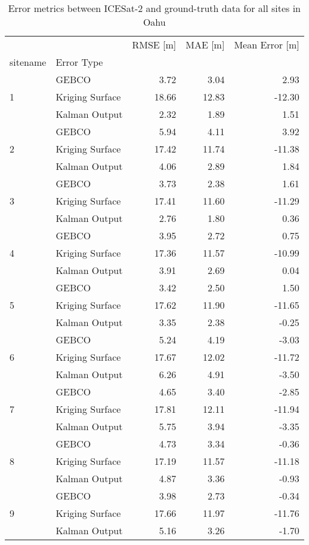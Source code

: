 \begin{table}[htbp]
\centering
\caption{Error metrics between ICESat-2 and ground-truth data for all sites in Oahu}
\label{tab:appendix_oahu_raster_error}
\begin{tabular}{llrrr}
\toprule
 &  & RMSE [m] & MAE [m] & Mean Error [m] \\
sitename & Error Type &  &  &  \\
\midrule
\multirow[c]{3}{*}{1} & GEBCO & 3.72 & 3.04 & 2.93 \\
 & Kriging Surface & 18.66 & 12.83 & -12.30 \\
 & Kalman Output & 2.32 & 1.89 & 1.51 \\
\cline{1-2}
\multirow[c]{3}{*}{2} & GEBCO & 5.94 & 4.11 & 3.92 \\
 & Kriging Surface & 17.42 & 11.74 & -11.38 \\
 & Kalman Output & 4.06 & 2.89 & 1.84 \\
\cline{1-2}
\multirow[c]{3}{*}{3} & GEBCO & 3.73 & 2.38 & 1.61 \\
 & Kriging Surface & 17.41 & 11.60 & -11.29 \\
 & Kalman Output & 2.76 & 1.80 & 0.36 \\
\cline{1-2}
\multirow[c]{3}{*}{4} & GEBCO & 3.95 & 2.72 & 0.75 \\
 & Kriging Surface & 17.36 & 11.57 & -10.99 \\
 & Kalman Output & 3.91 & 2.69 & 0.04 \\
\cline{1-2}
\multirow[c]{3}{*}{5} & GEBCO & 3.42 & 2.50 & 1.50 \\
 & Kriging Surface & 17.62 & 11.90 & -11.65 \\
 & Kalman Output & 3.35 & 2.38 & -0.25 \\
\cline{1-2}
\multirow[c]{3}{*}{6} & GEBCO & 5.24 & 4.19 & -3.03 \\
 & Kriging Surface & 17.67 & 12.02 & -11.72 \\
 & Kalman Output & 6.26 & 4.91 & -3.50 \\
\cline{1-2}
\multirow[c]{3}{*}{7} & GEBCO & 4.65 & 3.40 & -2.85 \\
 & Kriging Surface & 17.81 & 12.11 & -11.94 \\
 & Kalman Output & 5.75 & 3.94 & -3.35 \\
\cline{1-2}
\multirow[c]{3}{*}{8} & GEBCO & 4.73 & 3.34 & -0.36 \\
 & Kriging Surface & 17.19 & 11.57 & -11.18 \\
 & Kalman Output & 4.87 & 3.36 & -0.93 \\
\cline{1-2}
\multirow[c]{3}{*}{9} & GEBCO & 3.98 & 2.73 & -0.34 \\
 & Kriging Surface & 17.66 & 11.97 & -11.76 \\
 & Kalman Output & 5.16 & 3.26 & -1.70 \\
\cline{1-2}
\bottomrule
\end{tabular}
\end{table}
